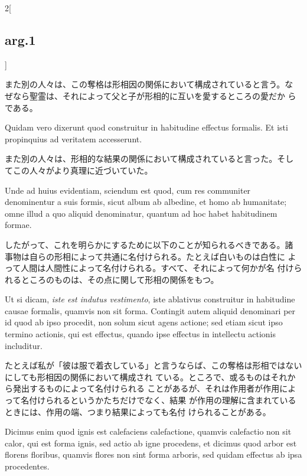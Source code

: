 \documentclass[paper=a4paper,fontsize=10pt,jafontsize=9pt,titlepage]{jlreq}
\begin{document}
\begin{paracol}{2}[\subsection{arg.1}]
\switchcolumn

また別の人々は、この奪格は形相因の関係において構成されていると言う。な
 ぜなら聖霊は、それによって父と子が形相的に互いを愛するところの愛だか
 らである。

\switchcolumn*

Quidam vero dixerunt
 quod construitur in habitudine effectus formalis. Et isti propinquius
 ad veritatem accesserunt.

\switchcolumn

また別の人々は、形相的な結果の関係において構成されていると言った。そし
 てこの人々がより真理に近づいていた。

\switchcolumn*

Unde ad huius evidentiam, sciendum est quod, cum res communiter
 denominentur a suis formis, sicut album ab albedine, et homo ab
 humanitate; omne illud a quo aliquid denominatur, quantum ad hoc
 habet habitudinem formae.

\switchcolumn

したがって、これを明らかにするために以下のことが知られるべきである。諸
 事物は自らの形相によって共通に名付けられる。たとえば白いものは白性に
 よって人間は人間性によって名付けられる。すべて、それによって何かが名
 付けられるところのものは、その点に関して形相の関係をもつ。

\switchcolumn*

Ut si dicam, {\itshape iste est indutus vestimento},
 iste ablativus construitur in habitudine causae formalis, quamvis non
 sit forma. Contingit autem aliquid denominari per id quod ab ipso
 procedit, non solum sicut agens actione; sed etiam sicut ipso termino
 actionis, qui est effectus, quando ipse effectus in intellectu
 actionis includitur.

\switchcolumn

たとえば私が「彼は服で着衣している」と言うならば、この奪格は形相ではないにしても形相因の関係において構成され
 ている。ところで、或るものはそれから発出するものによって名付けられる
 ことがあるが、それは作用者が作用によって名付けられるというかたちだけでなく、結果
 が作用の理解に含まれているときには、作用の端、つまり結果によっても名付
 けられることがある。

\switchcolumn*

Dicimus enim quod ignis est calefaciens
 calefactione, quamvis calefactio non sit calor, qui est forma ignis,
 sed actio ab igne procedens, et dicimus quod arbor est florens
 floribus, quamvis flores non sint forma arboris, sed quidam effectus
 ab ipsa procedentes.


\end{paracol}
\end{document}
